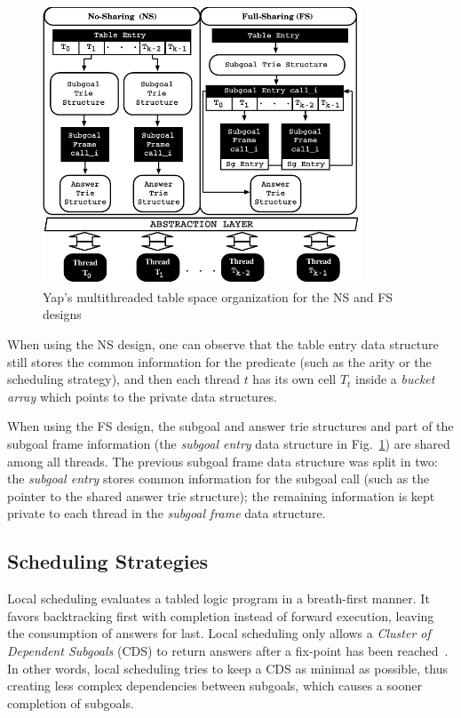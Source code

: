 \documentclass{llncs}
\begin{document}
\begin{figure}[!ht]
\centering
\includegraphics[width=9.5cm]{figures/yap_mt.pdf}
\caption{Yap's multithreaded table space organization for the NS and FS designs}
\label{fig_yap_mt_support}
\vspace{-\bigskipamount}
\end{figure}

When using the NS design, one can observe that the table entry data
structure still stores the common information for the predicate (such
as the arity or the scheduling strategy), and then each thread $t$ has
its own cell $T_t$ inside a \emph{bucket array} which points to the
private data structures.

When using the FS design, the subgoal and answer trie structures and
part of the subgoal frame information (the \emph{subgoal entry} data
structure in Fig.~\ref{fig_yap_mt_support}) are shared among all
threads. The previous subgoal frame data structure was split in two:
the \emph{subgoal entry} stores common information for the subgoal
call (such as the pointer to the shared answer trie structure); the
remaining information is kept private to each thread in the
\emph{subgoal frame} data structure.


\subsection{Scheduling Strategies}

Local scheduling evaluates a tabled logic program in a breath-first
manner. It favors backtracking first with completion instead of
forward execution, leaving the consumption of answers for last. Local
scheduling only allows a \emph{Cluster of Dependent Subgoals} (CDS) to
return answers after a fix-point has been reached~\cite{Freire-96}. In
other words, local scheduling tries to keep a CDS as minimal as
possible, thus creating less complex dependencies between subgoals,
which causes a sooner completion of subgoals.
\end{document}

